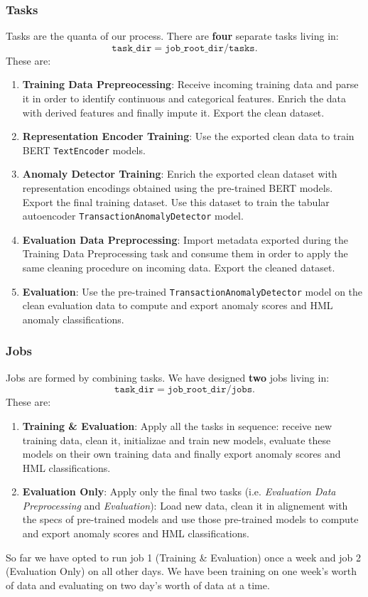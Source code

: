 \documentclass[a4paper, 10pt]{article}
\theoremstyle{plain}
\theoremstyle{definition}
\numberwithin{equation}{section}
\begin{document}
\subsubsection{Tasks}
Tasks are the quanta of our process. There are \textbf{four} separate tasks living in:
\begin{equation}\nonumber
    \texttt{task\_dir} = \texttt{job\_root\_dir}/\texttt{tasks}.
\end{equation}
These are:
\begin{enumerate}
    \item \textbf{Training Data Prepreocessing}: Receive incoming training data and parse it in order to identify continuous and categorical features. Enrich the data with derived features and finally impute it. Export the clean dataset.
    \item \textbf{Representation Encoder Training}: Use the exported clean data to train BERT \texttt{TextEncoder} models.
    \item \textbf{Anomaly Detector Training}: Enrich the exported clean dataset with representation encodings obtained using the pre-trained BERT models. Export the final training dataset. Use this dataset to train the tabular autoencoder \texttt{TransactionAnomalyDetector} model.
    \item \textbf{Evaluation Data Preprocessing}: Import metadata exported during the Training Data Preprocessing task and consume them in order to apply the same cleaning procedure on incoming data. Export the cleaned dataset.
    \item \textbf{Evaluation}: Use the pre-trained \texttt{TransactionAnomalyDetector} model on the clean evaluation data to compute and export anomaly scores and HML anomaly classifications.
\end{enumerate}
\subsubsection{Jobs}
Jobs are formed by combining tasks. We have designed \textbf{two} jobs living in:
\begin{equation}\nonumber
    \texttt{task\_dir} = \texttt{job\_root\_dir}/\texttt{jobs}.
\end{equation}
These are:
\begin{enumerate}
    \item \textbf{Training \& Evaluation}: Apply all the tasks in sequence: receive new training data, clean it, initializae and train new models, evaluate these models on their own training data and finally export anomaly scores and HML classifications.
    \item \textbf{Evaluation Only}: Apply only the final two tasks (i.e. \textit{Evaluation Data Preprocessing} and \textit{Evaluation}): Load new data, clean it in alignement with the specs of pre-trained models and use those pre-trained models to compute and export anomaly scores and HML classifications.
\end{enumerate}
So far we have opted to run job 1 (Training \& Evaluation) once a week and job 2 (Evaluation Only) on all other days. We have been training on one week's worth of data and evaluating on two day's worth of data at a time.
\end{document}
